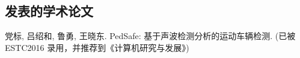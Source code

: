 \begin{resume}

  \section*{发表的学术论文} %

  \begin{enumerate}[{[}1{]}]
  \addtolength{\itemsep}{-.36\baselineskip}%
  \item 党标, 吕绍和, 鲁勇, 王晓东. PedSafe: 基于声波检测分析的运动车辆检测. (已被 ESTC2016 录用，并推荐到《计算机研究与发展》)
  \end{enumerate}

\end{resume}
